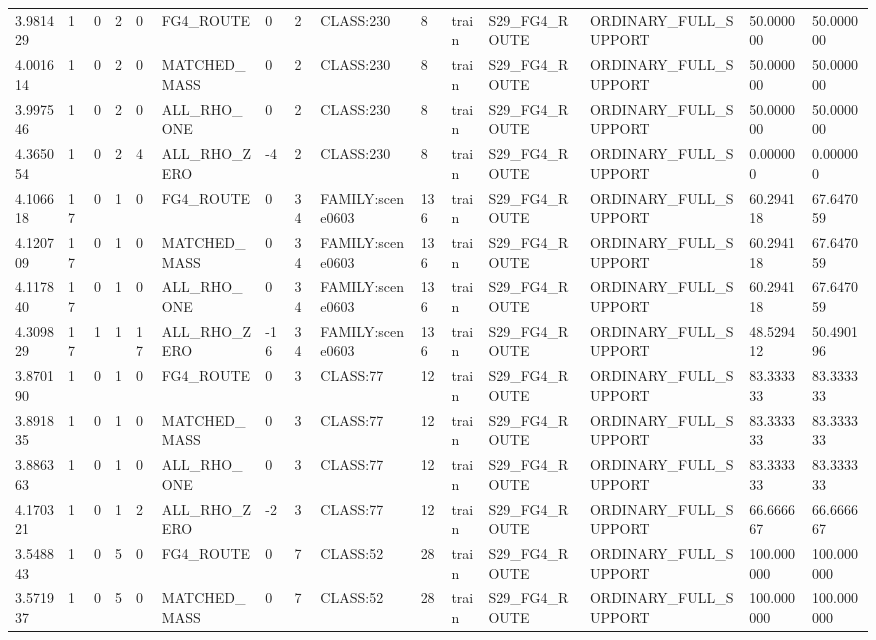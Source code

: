 \begin{tabular}{lllllllllllllll}
3.981429 & 1 & 0 & 2 & 0 & FG4\_ROUTE & 0 & 2 & CLASS:230 & 8 & train & S29\_FG4\_ROUTE & ORDINARY\_FULL\_SUPPORT & 50.000000 & 50.000000 \\
4.001614 & 1 & 0 & 2 & 0 & MATCHED\_MASS & 0 & 2 & CLASS:230 & 8 & train & S29\_FG4\_ROUTE & ORDINARY\_FULL\_SUPPORT & 50.000000 & 50.000000 \\
3.997546 & 1 & 0 & 2 & 0 & ALL\_RHO\_ONE & 0 & 2 & CLASS:230 & 8 & train & S29\_FG4\_ROUTE & ORDINARY\_FULL\_SUPPORT & 50.000000 & 50.000000 \\
4.365054 & 1 & 0 & 2 & 4 & ALL\_RHO\_ZERO & -4 & 2 & CLASS:230 & 8 & train & S29\_FG4\_ROUTE & ORDINARY\_FULL\_SUPPORT & 0.000000 & 0.000000 \\
4.106618 & 17 & 0 & 1 & 0 & FG4\_ROUTE & 0 & 34 & FAMILY:scene0603 & 136 & train & S29\_FG4\_ROUTE & ORDINARY\_FULL\_SUPPORT & 60.294118 & 67.647059 \\
4.120709 & 17 & 0 & 1 & 0 & MATCHED\_MASS & 0 & 34 & FAMILY:scene0603 & 136 & train & S29\_FG4\_ROUTE & ORDINARY\_FULL\_SUPPORT & 60.294118 & 67.647059 \\
4.117840 & 17 & 0 & 1 & 0 & ALL\_RHO\_ONE & 0 & 34 & FAMILY:scene0603 & 136 & train & S29\_FG4\_ROUTE & ORDINARY\_FULL\_SUPPORT & 60.294118 & 67.647059 \\
4.309829 & 17 & 1 & 1 & 17 & ALL\_RHO\_ZERO & -16 & 34 & FAMILY:scene0603 & 136 & train & S29\_FG4\_ROUTE & ORDINARY\_FULL\_SUPPORT & 48.529412 & 50.490196 \\
3.870190 & 1 & 0 & 1 & 0 & FG4\_ROUTE & 0 & 3 & CLASS:77 & 12 & train & S29\_FG4\_ROUTE & ORDINARY\_FULL\_SUPPORT & 83.333333 & 83.333333 \\
3.891835 & 1 & 0 & 1 & 0 & MATCHED\_MASS & 0 & 3 & CLASS:77 & 12 & train & S29\_FG4\_ROUTE & ORDINARY\_FULL\_SUPPORT & 83.333333 & 83.333333 \\
3.886363 & 1 & 0 & 1 & 0 & ALL\_RHO\_ONE & 0 & 3 & CLASS:77 & 12 & train & S29\_FG4\_ROUTE & ORDINARY\_FULL\_SUPPORT & 83.333333 & 83.333333 \\
4.170321 & 1 & 0 & 1 & 2 & ALL\_RHO\_ZERO & -2 & 3 & CLASS:77 & 12 & train & S29\_FG4\_ROUTE & ORDINARY\_FULL\_SUPPORT & 66.666667 & 66.666667 \\
3.548843 & 1 & 0 & 5 & 0 & FG4\_ROUTE & 0 & 7 & CLASS:52 & 28 & train & S29\_FG4\_ROUTE & ORDINARY\_FULL\_SUPPORT & 100.000000 & 100.000000 \\
3.571937 & 1 & 0 & 5 & 0 & MATCHED\_MASS & 0 & 7 & CLASS:52 & 28 & train & S29\_FG4\_ROUTE & ORDINARY\_FULL\_SUPPORT & 100.000000 & 100.000000 \\

\end{tabular}
